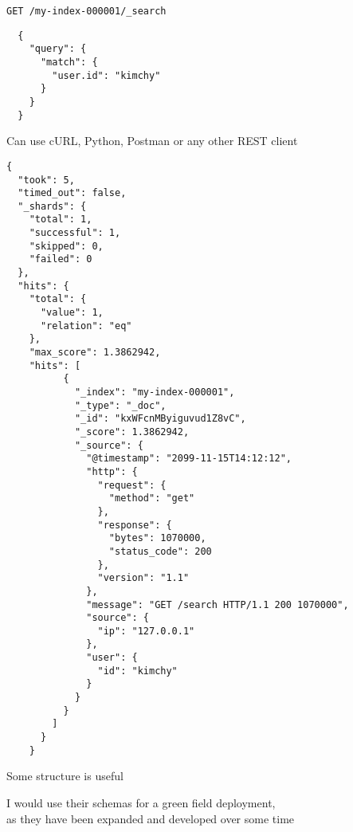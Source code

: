 \documentclass[Screen16to9,17pt]{foils}
\begin{document}


\verb+GET /my-index-000001/_search+
\begin{verbatim}
  {
    "query": {
      "match": {
        "user.id": "kimchy"
      }
    }
  }
\end{verbatim}


\begin{list2}
  \item Can use cURL, Python, Postman or any other REST client
\end{list2}



\begin{verbatim}
{
  "took": 5,
  "timed_out": false,
  "_shards": {
    "total": 1,
    "successful": 1,
    "skipped": 0,
    "failed": 0
  },
  "hits": {
    "total": {
      "value": 1,
      "relation": "eq"
    },
    "max_score": 1.3862942,
    "hits": [
          {
            "_index": "my-index-000001",
            "_type": "_doc",
            "_id": "kxWFcnMByiguvud1Z8vC",
            "_score": 1.3862942,
            "_source": {
              "@timestamp": "2099-11-15T14:12:12",
              "http": {
                "request": {
                  "method": "get"
                },
                "response": {
                  "bytes": 1070000,
                  "status_code": 200
                },
                "version": "1.1"
              },
              "message": "GET /search HTTP/1.1 200 1070000",
              "source": {
                "ip": "127.0.0.1"
              },
              "user": {
                "id": "kimchy"
              }
            }
          }
        ]
      }
    }
\end{verbatim}





\begin{quote}

\end{quote}

\begin{list2}
  \item
  \item Some structure is useful
  \item I would use their schemas for a green field deployment,\\
  as they have been expanded and developed over some time
\end{list2}
\end{document}
